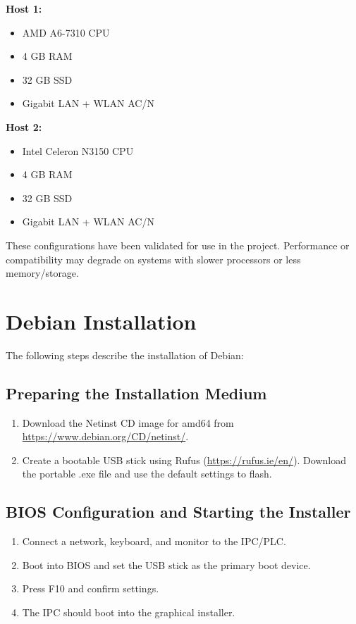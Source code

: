 \documentclass[a4paper,12pt]{article}
\begin{document}
\textbf{Host 1:}
\begin{itemize}
	\item AMD A6-7310 CPU
	\item 4 GB RAM
	\item 32 GB SSD
	\item Gigabit LAN + WLAN AC/N
\end{itemize}

\textbf{Host 2:}
\begin{itemize}
	\item Intel Celeron N3150 CPU
	\item 4 GB RAM
	\item 32 GB SSD
	\item Gigabit LAN + WLAN AC/N
\end{itemize}

These configurations have been validated for use in the project. Performance or compatibility may degrade on systems with slower processors or less memory/storage.


\section{Debian Installation}
The following steps describe the installation of Debian:

\subsection{Preparing the Installation Medium}
\begin{enumerate}
\item Download the Netinst CD image for amd64 from \url{https://www.debian.org/CD/netinst/}.
\item Create a bootable USB stick using Rufus (\url{https://rufus.ie/en/}). Download the portable .exe file and use the default settings to flash.
\end{enumerate}

\subsection{BIOS Configuration and Starting the Installer}
\begin{enumerate}
\item Connect a network, keyboard, and monitor to the IPC/PLC.
\item Boot into BIOS and set the USB stick as the primary boot device.
\item Press F10 and confirm settings.
\item The IPC should boot into the graphical installer.
\end{enumerate}
\end{document}
